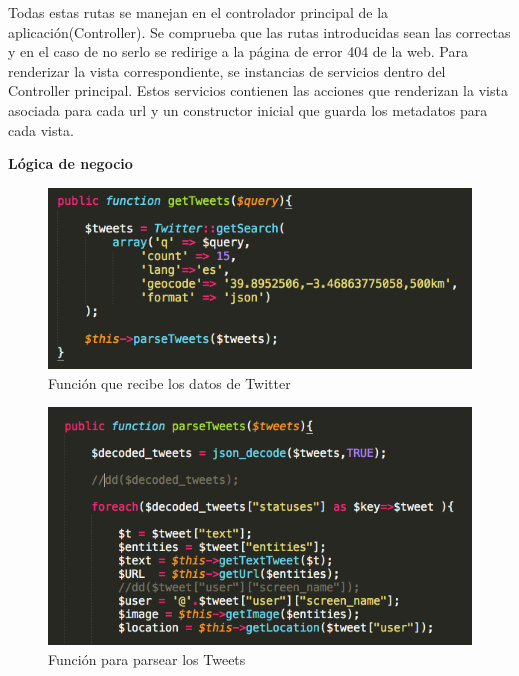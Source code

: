 Todas estas rutas se manejan en el controlador principal de la aplicación(Controller). Se comprueba que las rutas introducidas sean las correctas y en el caso de no serlo se redirige a la página de error 404 de la web. Para renderizar la vista correspondiente, se instancias de servicios dentro del Controller principal. Estos servicios contienen las acciones que renderizan la vista asociada para cada url y un constructor inicial que guarda los metadatos para cada vista.

\vspace{5 mm}

\textbf{Lógica de negocio}

\begin{figure}
\begin{center}
\includegraphics[width=1.0\textwidth]{imagenes/getTweets.png}
\caption{Función que recibe los datos de Twitter}
\label{getTweets-app}
\end{center}
\end{figure}

\begin{figure}
\begin{center}
\includegraphics[width=1.0\textwidth]{imagenes/parseTweets.png}
\caption{Función para parsear los Tweets}
\label{parseTweets-app}
\end{center}
\end{figure}

